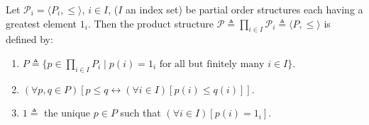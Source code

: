 Let $\mathcal{P}_i = \langle P_i, \leq \rangle$, $i \in I$, ($I$ an index set) be partial order structures each having a greatest element $1_i$. Then the product structure $\mathcal{P} \triangleq \prod_{i \in I} \mathcal{P}_i \triangleq \langle P, \leq \rangle$ is defined by:
\begin{enumerate}
\item $P \triangleq \{p \in \prod_{i \in I} P_i \mid p(i) = 1_i \text{ for all but finitely many } i \in I\}$.
\item $(\forall p, q \in P)[p \leq q \leftrightarrow (\forall i \in I)[p(i) \leq q(i)]]$.
\item $1 \triangleq$ the unique $p \in P$ such that $(\forall i \in I)[p(i) = 1_i]$.
\end{enumerate}
